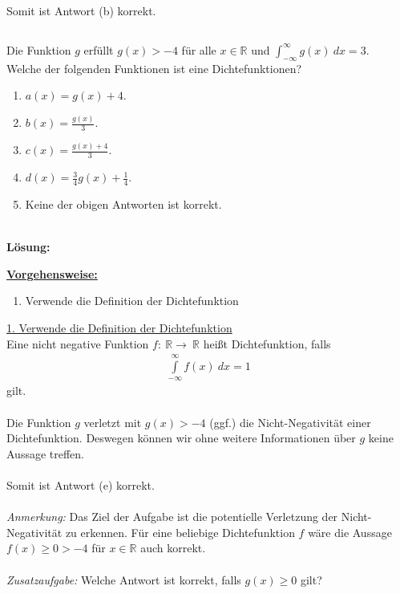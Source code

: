 Somit ist Antwort (b) korrekt.


\newpage

\newpage
\subsection*{}
Die Funktion $g$ erfüllt $g(x) > -4$ für alle $x \in \mathbb{R}$ und $\int_{- \infty}^\infty g(x) \ dx = 3$.\\
Welche der folgenden Funktionen ist eine Dichtefunktionen?
\renewcommand{\labelenumi}{(\alph{enumi})}
\begin{enumerate}
	\item 
	$ a(x) = g(x) + 4$.
	\item 
	$ b(x) = \frac{g(x)}{3}$.
	\item
	$ c(x) = \frac{g(x) + 4}{3} $.
	\item
	$ d(x) = \frac{3}{4} g(x) + \frac{1}{4} $.
	\item
	Keine der obigen Antworten ist korrekt.
\end{enumerate}
\ \\
\textbf{Lösung:}
\begin{mdframed}
	\underline{\textbf{Vorgehensweise:}}
	\renewcommand{\labelenumi}{\theenumi.}
	\begin{enumerate}
		\item Verwende die Definition der Dichtefunktion
	\end{enumerate}
\end{mdframed}

\underline{1. Verwende die Definition der Dichtefunktion}\\
Eine nicht negative Funktion $f : \ \mathbb{R} \to \ \mathbb{R}$ heißt Dichtefunktion, falls
\begin{align*}
	\int \limits_{- \infty}^\infty f(x) \ dx = 1
\end{align*}
gilt.\\
\\
Die Funktion $g$ verletzt mit $g(x) > - 4$ (ggf.) die Nicht-Negativität einer Dichtefunktion. Deswegen können wir ohne weitere Informationen über $g$ keine Aussage treffen.\\
\\
Somit ist Antwort (e) korrekt.\\
\\
\textit{Anmerkung:} Das Ziel der Aufgabe ist die potentielle Verletzung der Nicht-Negativität zu erkennen. Für eine beliebige Dichtefunktion $f$ wäre die Aussage $f(x) \geq 0 > -4 $ für $x \in \mathbb{R}$ auch korrekt.\\
\\
\textit{Zusatzaufgabe:} Welche Antwort ist korrekt, falls $g(x) \geq 0 $ gilt?



